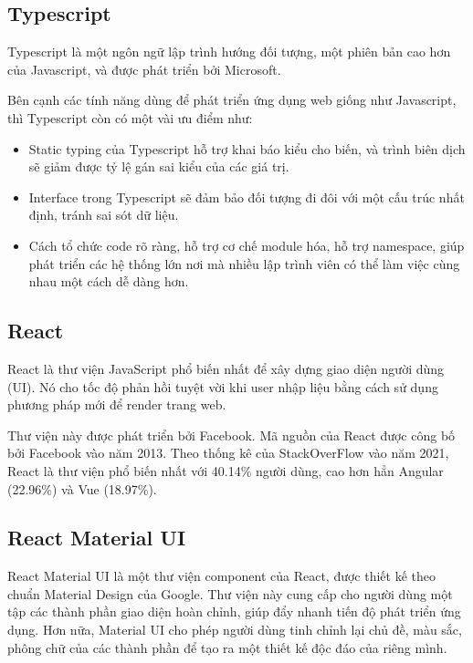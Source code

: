 \documentclass[./../main.tex]{subfiles}
\begin{document}
\hypertarget{typescript}{%
	\subsection{Typescript}\label{typescript}}

Typescript \cite{Type22} là một ngôn ngữ lập trình hướng đối tượng, một phiên bản cao hơn của Javascript, và được phát triển bởi Microsoft.

Bên cạnh các tính năng dùng để phát triển ứng dụng web  giống như Javascript, thì Typescript còn có một vài ưu điểm như:

\begin{itemize}
	\item

	      Static typing của Typescript hỗ trợ khai báo kiểu cho biến, và trình biên dịch sẽ giảm được tỷ lệ gán sai kiểu của các giá trị.

	\item
	      Interface trong Typescript sẽ đảm bảo đối tượng đi đôi với một cấu trúc nhất định, tránh sai sót dữ liệu.

	\item
	      Cách tổ chức code rõ ràng, hỗ trợ cơ chế module hóa, hỗ trợ namespace, giúp phát triển các hệ thống lớn nơi mà nhiều lập trình viên có thể làm việc cùng nhau một cách dễ dàng hơn.

\end{itemize}

\hypertarget{react}{%
	\subsection{React}\label{react}}

React \cite{React22} là thư viện JavaScript phổ biến nhất để xây dựng giao diện người
dùng (UI). Nó cho tốc độ phản hồi tuyệt vời khi user nhập liệu bằng cách
sử dụng phương pháp mới để render trang web.

Thư viện này được phát triển bởi Facebook. Mã nguồn của React được công
bố bởi Facebook vào năm 2013. Theo thống kê của StackOverFlow vào năm
2021, React là thư viện phổ biến nhất với 40.14\% người dùng, cao hơn
hẳn Angular (22.96\%) và Vue (18.97\%).

\hypertarget{react-material-ui}{%
	\subsection{React Material UI}\label{react-material-ui}}

React Material UI \cite{MUI22} là một thư viện component của React, được thiết kế
theo chuẩn Material Design của Google. Thư viện này cung cấp cho người
dùng một tập các thành phần giao diện hoàn chỉnh, giúp đẩy nhanh tiến độ
phát triển ứng dụng. Hơn nữa, Material UI cho phép người dùng tinh chỉnh
lại chủ đề, màu sắc, phông chữ của các thành phần để tạo ra một thiết kế
độc đáo của riêng mình.
\end{document}
